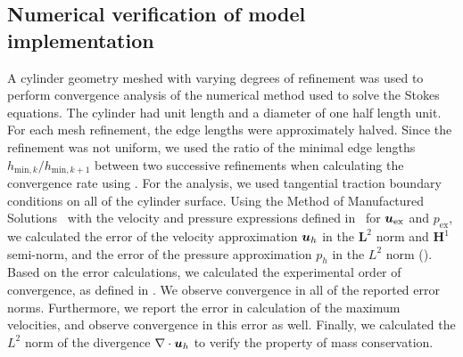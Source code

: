 \documentclass{WileyMSP-template}
\begin{document}
\subsection{Numerical verification of model implementation}\label{subsec:numerical_verification}
A cylinder geometry meshed with varying degrees of refinement was used to
perform convergence analysis of the numerical method used to solve the Stokes equations.
The cylinder had unit length and a diameter of one half length unit.
For each mesh refinement, the edge lengths were approximately halved.
Since the refinement was not uniform, we used the ratio of the minimal
edge lengths $h_{\mathrm{min}, k}/h_{\mathrm{min}, k+1}$ between two 
successive refinements when calculating the convergence rate using
.
For the analysis, we used tangential traction boundary conditions on all
of the cylinder surface. Using the Method of Manufactured Solutions~\cite{Roache2001CodeSolutions}
with the velocity and pressure expressions defined in~
for $\bm{u}_{\mathrm{ex}}$ and $p_{\mathrm{ex}}$, we calculated the error of 
the velocity approximation $\bm{u}_h$
in the $\mathbf{L}^2$ norm and $\mathbf{H}^1$ semi-norm,
and the error of the pressure approximation $p_h$ in the $L^2$ norm ().
Based on the error calculations,
we calculated the experimental order of convergence,
as defined in .
We observe convergence in all of the reported error norms. Furthermore,
we report the error in calculation of the maximum velocities, and observe
convergence in this error as well. Finally, we calculated the $L^2$ norm of
the divergence $\nabla\cdot\bm{u}_h$ to verify the property of mass conservation.
\end{document}
